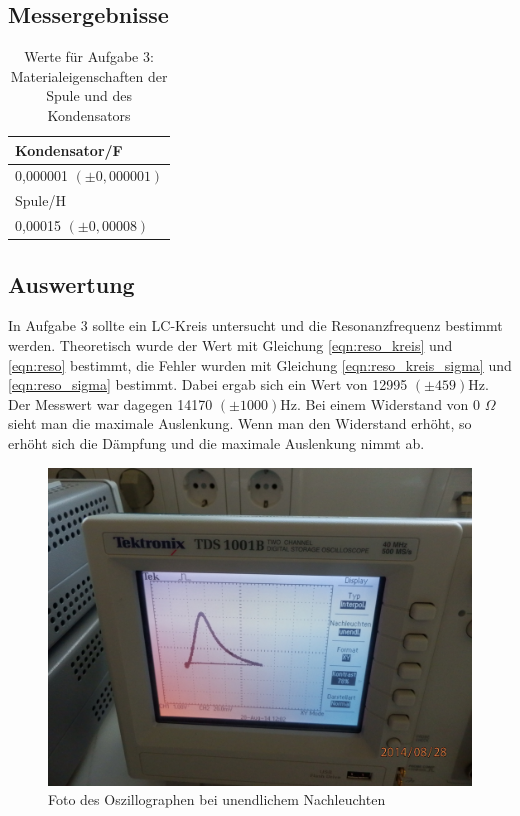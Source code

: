 \documentclass[12pt]{scrartcl}
\begin{document}
\subsection{Messergebnisse}

\begin{table}[htbp]
\caption{Werte für Aufgabe 3: Materialeigenschaften der Spule und des Kondensators}
\begin{center}
\begin{tabular}{|l|}
\hline
Kondensator/F \\ \hline
0,000001 $(\pm  0,000001)$ \\ \hline
Spule/H \\ \hline
0,00015 $(\pm 0,00008)$ \\ \hline
\end{tabular}
\end{center}
\label{tab:3}
\end{table}
\subsection{Auswertung}

In Aufgabe 3 sollte ein LC-Kreis untersucht und die Resonanzfrequenz bestimmt werden. Theoretisch wurde der Wert mit Gleichung \ref{eqn:reso_kreis} und \ref{eqn:reso} bestimmt, die Fehler wurden mit Gleichung \ref{eqn:reso_kreis_sigma} und \ref{eqn:reso_sigma} bestimmt.
Dabei ergab sich ein Wert von 12995 $(\pm 459)$Hz. Der Messwert war dagegen 14170 $(\pm 1000)$Hz. Bei einem Widerstand von 0 $\Omega$ sieht man die maximale Auslenkung. Wenn man den Widerstand erhöht, so erhöht sich die Dämpfung und die maximale Auslenkung nimmt ab.

\begin{figure}[htbp] 
  \centering
    \includegraphics[scale = 0.2]{aufgabe3_2.JPG}
  	\caption[Foto des Oszillographen bei "unendlichem" Nachleuchten]{Foto des Oszillographen bei unendlichem Nachleuchten}
  \label{fig:teil_6}
\end{figure}
\end{document}
